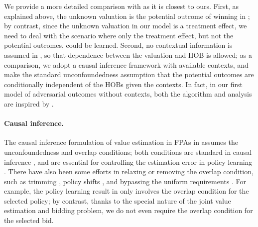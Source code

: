 We provide a more detailed comparison with \cite{cesa2024role} as it is closest to ours. First, as explained above, the unknown valuation is the potential outcome of winning in \cite{cesa2024role}; by contrast, since the unknown valuation in our model is a treatment effect, we need to deal with the scenario where only the treatment effect, but not the potential outcomes, could be learned. Second, no contextual information is assumed in \cite{cesa2024role}, so that dependence between the valuation and HOB is allowed; as a comparison, we adopt a causal inference framework with available contexts, and make the standard unconfoundedness assumption that the potential outcomes are conditionally independent of the HOBs given the contexts. In fact, in our first model of adversarial outcomes without contexts, both the algorithm and analysis are inspired by \cite{cesa2024role}.  

\paragraph{Causal inference.} The causal inference formulation of value estimation in FPAs in \cite{waisman2024online} assumes the unconfoundedness and overlap conditions; both conditions are standard in causal inference \cite{imbens2015causal}, and are essential for controlling the estimation error in policy learning \cite{athey2021policy,zhou2023offline}. There have also been some efforts in relaxing or removing the overlap condition, such as trimming \cite{yang2018asymptotic,branson2023causal}, policy shifts \cite{zhao2024positivity}, and bypassing the uniform requirements \cite{jin2022policy}. For example, the policy learning result in \cite{jin2022policy} only involves the overlap condition for the selected policy; by contrast, thanks to the special nature of the joint value estimation and bidding problem, we do not even require the overlap condition for the selected bid.
